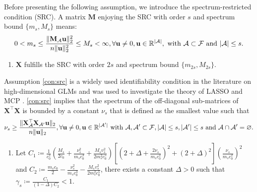 Before presenting the following assumption, we introduce the spectrum-restricted condition (SRC).
A matrix $\mathbf{M}$ enjoying the SRC with order $s$ and spectrum bound $\{m_{s},M_{s}\}$ means:
\begin{align*}
0<m_s\leq \frac{\|\mathbf{M}_{\mathcal{A}}\mathbf{u}\|_2^2}{n\|\mathbf{u}\|_2^2}\leq M_s <\infty,\forall \mathbf{u}\neq 0, \mathbf{u} \in \mathbb{R}^{|\mathcal{A}|}, ~\mathrm{with} ~ \mathcal{A} \subset \mathcal{F} ~\mathrm{and} ~ |\mathcal{A}|\leq s.
\end{align*}
\begin{enumerate}[label=(A\arabic*), start=3]
\item
$\mathbf{X}$ fulfills the SRC with order $2s$ and spectrum bound $\{m_{2s},M_{2s}\}$. \label{con:src}
\end{enumerate}
Assumption \ref{con:src} is a widely used identifiability condition in the literature on high-dimensional GLMs \citep{shi2019linear} and was used to investigate the theory of LASSO and MCP \citep{zhang2008sparsity, zhang2010nearly}.
\ref{con:src} implies that the spectrum of the off-diagonal sub-matrices of $\mathbf{X}^\top\mathbf{X}$ is bounded by a constant $\nu_s$ that
is defined as the smallest value such that \label{con:off-diagonal-spectrum}
$$\nu_s \geq \frac{\|\mathbf{X}_\mathcal{A}^\top\mathbf{X}_{\mathcal{A}^\prime}\mathbf{u}\|_2}{n\|\mathbf{u}\|_2}, \forall \mathbf{u}\neq 0, \mathbf{u}\in \mathbb{R}^{|\mathcal{A}^\prime|}~\mathrm{with} ~ \mathcal{A}, \mathcal{A}^\prime \subset \mathcal{F}, |\mathcal{A}|\leq s, |\mathcal{A}^\prime|\leq s ~\mathrm{and} ~ \mathcal{A}\cap \mathcal{A}^\prime= \varnothing.$$
\begin{enumerate}[label=(A\arabic*), start=4]
\item Let
$C_1 \coloneqq \frac{1}{c_0^2}\left(\frac{M_s}{2c_0} + \frac{\nu_s^2}{m_sc_0^3} + \frac{M_sv_s^2}{2m_s^2c_0^5}\right)\left[( 2 + \Delta+ \frac{2\nu_s}{m_sc_0^2})^2 + (2+\Delta)^2\right]\left(\frac{\nu_s}{m_sc_0^2}\right)^2$
and $C_2 \coloneqq \frac{m_sc_0}{2} - \frac{\nu_s^2}{m_sc_0^3} - \frac{M_sv_s^2}{2m_s^2c_0^5}$,
there exists a constant $\Delta > 0$ such that $\gamma_s\coloneqq \frac{C_1}{(1-\Delta)C_2}<1$.
\label{con:technical-assumption}
\end{enumerate}
